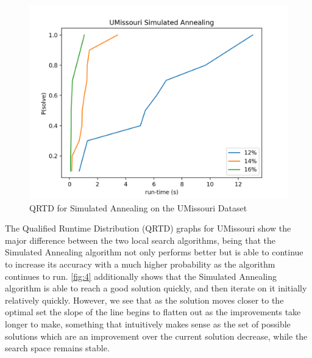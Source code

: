 \documentclass[format=sigconf]{acmart}
\begin{document}
\begin{figure}[htbp]
    \centerline{\includegraphics[scale=.5]{graphs/UMissouri_LS2_QRTD.png}}
    \caption{QRTD for Simulated Annealing on the UMissouri Dataset}
    \label{fig:4}
\end{figure}

The Qualified Runtime Distribution (QRTD) graphs for UMissouri show the major difference between the two local search algorithms, being that the 
Simulated Annealing algorithm not only performs better but is able to continue to increase its accuracy with a much higher 
probability as the algorithm continues to run. \autoref{fig:4} additionally shows that the Simulated Annealing algorithm is able 
to reach a good solution quickly, and then iterate on it initially relatively quickly. However, we see that as the solution moves 
closer to the optimal set the slope of the line begins to flatten out as the improvements take longer to make, something that intuitively makes sense 
as the set of possible solutions which are an improvement over the current solution decrease, while the search space remains stable.
\newpage
\end{document}
